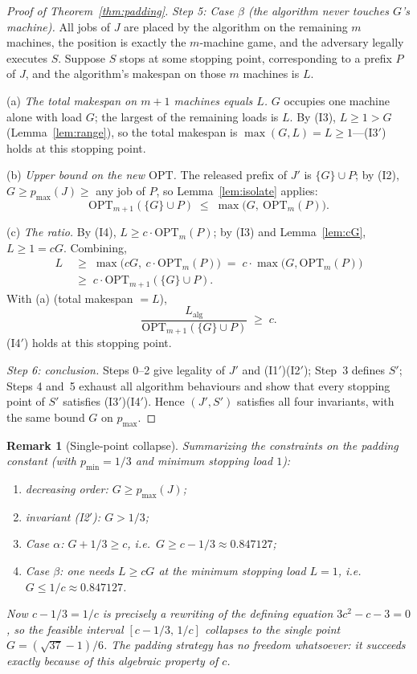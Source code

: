 \documentclass[11pt]{article}
\newtheorem{remark}[theorem]{Remark}
\theoremstyle{definition}
\newcommand{\opt}{\mathrm{OPT}}
\newcommand{\alg}{\mathrm{alg}}
\begin{document}
\begin{proof}[Proof of Theorem~\ref{thm:padding}]
\emph{Step 5: Case $\beta$ (the algorithm never touches $G$'s machine).}
All jobs of $J$ are placed by the algorithm on the remaining $m$ machines,
the position is exactly the $m$-machine game, and the adversary legally
executes $S$. Suppose $S$ stops at some stopping point, corresponding to a
prefix $P$ of $J$, and the algorithm's makespan on those $m$ machines is
$L$.

(a) \emph{The total makespan on $m+1$ machines equals $L$.}
$G$ occupies one machine alone with load $G$; the largest of the remaining
loads is $L$. By (I3), $L\ge 1>G$ (Lemma~\ref{lem:range}), so the total
makespan is $\max(G,L)=L\ge 1$---(I3$'$) holds at this stopping point.

(b) \emph{Upper bound on the new $\opt$.}
The released prefix of $J'$ is $\{G\}\cup P$; by (I2), $G\ge p_{\max}(J)\ge$
any job of $P$, so Lemma~\ref{lem:isolate} applies:
\[
\opt_{m+1}(\{G\}\cup P)\;\le\;\max\bigl(G,\ \opt_{m}(P)\bigr).
\]

(c) \emph{The ratio.}
By (I4), $L\ge c\cdot\opt_{m}(P)$; by (I3) and Lemma~\ref{lem:cG},
$L\ge 1=cG$. Combining,
\[
\begin{aligned}
L&\;\ge\;\max\bigl(cG,\ c\cdot\opt_{m}(P)\bigr)
 \;=\;c\cdot\max\bigl(G,\opt_{m}(P)\bigr)\\
 &\;\ge\;c\cdot\opt_{m+1}(\{G\}\cup P).
\end{aligned}
\]
With (a) (total makespan $=L$),
\[
\frac{L_{\alg}}{\opt_{m+1}(\{G\}\cup P)}\;\ge\;c .
\]
(I4$'$) holds at this stopping point.

\emph{Step 6: conclusion.}
Steps 0--2 give legality of $J'$ and (I1$'$)(I2$'$); Step~3 defines $S'$;
Steps 4 and~5 exhaust all algorithm behaviours and show that every stopping
point of $S'$ satisfies (I3$'$)(I4$'$). Hence $(J',S')$ satisfies all four
invariants, with the same bound $G$ on $p_{\max}$.
\end{proof}

\begin{remark}[Single-point collapse]
\label{rem:collapse}
Summarizing the constraints on the padding constant (with $p_{\min}=1/3$ and
minimum stopping load $1$):
\begin{enumerate}
\item decreasing order: $G\ge p_{\max}(J)$;
\item invariant (I2$'$): $G>1/3$;
\item Case $\alpha$: $G+1/3\ge c$, i.e.\ $G\ge c-1/3\approx0.847127$;
\item Case $\beta$: one needs $L\ge cG$ at the minimum stopping load $L=1$,
i.e.\ $G\le 1/c\approx0.847127$.
\end{enumerate}
Now $c-1/3=1/c$ is precisely a rewriting of the defining equation
$3c^{2}-c-3=0$, so the feasible interval $[c-1/3,\,1/c]$ collapses to the
single point $G=(\sqrt{37}-1)/6$. The padding strategy has no freedom
whatsoever: it succeeds exactly because of this algebraic property of $c$.
\end{remark}
\end{document}
